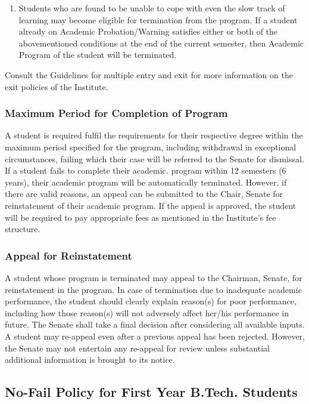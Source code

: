 \begin{enumerate}
    \item Students who are found to be unable to cope with even the slow track of learning may become eligible for termination from the program. If a student already on Academic Probation/Warning satisfies either or both of the abovementioned conditions at the end of the current semester, then Academic Program of the student will be terminated.
\end{enumerate}

Consult the Guidelines for multiple entry and exit for more information on the exit policies of the Institute.

\subsubsection{Maximum Period for Completion of Program}

A student is required fulfil the requirements for their respective degree within the maximum period specified for the program, including withdrawal in exceptional circumstances, failing which their case will be referred to the Senate for dismissal. If a student fails to complete their academic. program within 12 semesters (6 years), their academic program will be automatically terminated. However, if there are valid reasons, an appeal can be submitted to the Chair, Senate for reinstatement of their academic program. If the appeal is approved, the student will be required to pay appropriate fees as mentioned in the Institute's fee structure.

\subsubsection{Appeal for Reinstatement}

A student whose program is terminated may appeal to the Chairman, Senate, for reinstatement in the program. In case of termination due to inadequate academic performance, the student should clearly explain reason(s) for poor performance, including how those reason(s) will not adversely affect her/his performance in future. The Senate shall take a final decision after considering all available inputs. A student may re-appeal even after a previous appeal has been rejected. However, the Senate may not entertain any re-appeal for review unless substantial additional information is brought to its notice.

\subsection{No-Fail Policy for First Year B.Tech. Students}

